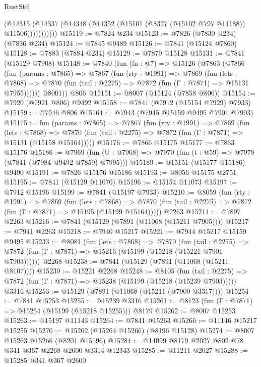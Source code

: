 \begin{lexlean}{RustStd}
\begin{coremodule}
                (@14315
                  (@14337 (@14348 (@14352 (@15101 (@8327 (@15102 @797 @11188)) @11506)))))))))))
@15119 := @7824 @234
@15123 := @7826 (@7830 @234) (@7836 @234)
@15124 := @7845 @9489
@15126 := @7841 (@15124 @7860)
@15128 := @7883 (@7884 @234)
@15129 := @7879 @15128
@15131 := @7841 (@15129 @7908)
@15148 := @7840
    (fun (fn : @7) =>
    @15126
      (@7863
        (@7866
          (fun (params : @7865) =>
          @7867
            (fun (rty : @1991) =>
            @7869
              (fun (lets : @7868) =>
              @7870 (fun (tail : @2275) => @7872 (fun (Γ : @7871) => @15131 @7955))))))
        @8001))
    @806
@15151 := @8007 (@15124 (@7858 @806))
@15154 := @7920 (@7921 @806) @9492
@15158 := @7841 (@7912 (@15154 @7929) @7933)
@15159 := @7946 @806
@15164 := @7943 (@7945 @15159 @9495 @7901 @7903)
@15175 := fun (params : @7865) =>
  @7867
    (fun (rty : @1991) =>
    @7869
      (fun (lets : @7868) =>
      @7870 (fun (tail : @2275) => @7872 (fun (Γ : @7871) => @15131 (@15158 @15164)))))
@15176 := @7866 @15175
@15177 := @7863 @15176
@15186 := @7969
    (fun (U : @7968) => @7970 (fun (t : @59) => @7978 (@7841 (@7984 @9492 @7859) @7995)))
@15189 := @15151 (@15177 @15186) @9490
@15191 := @7826 @15176 @15186
@15193 := @8056 @15175 @2751
@15195 := @7841 (@15129 @11070)
@15196 := @15154 @11073
@15197 := @7912 @15196
@15199 := @7841 (@15197 @7933)
@15210 := @8059
    (fun (rty : @1991) =>
    @7869
      (fun (lets : @7868) =>
      @7870 (fun (tail : @2275) => @7872 (fun (Γ : @7871) => @15195 (@15199 @15164)))))
    @2263
@15211 := @7897 @2263
@15216 := @7841 (@15129 (@7891 (@11068 (@15211 @7905))))
@15217 := @7941 @2263
@15218 := @7940 @15217
@15221 := @7944 @15217 @15159 @9495
@15233 := @8081
    (fun (lets : @7868) =>
    @7870
      (fun (tail : @2275) =>
      @7872 (fun (Γ : @7871) => @15216 (@15199 (@15218 (@15221 @7901 @7903))))))
    @2268
@15238 := @7841 (@15129 (@7891 (@11068 (@15211 @8107))))
@15239 := @15221 @2268
@15248 := @8105
    (fun (tail : @2275) => @7872 (fun (Γ : @7871) => @15238 (@15199 (@15218 (@15239 @7903)))))
    @3316
@15253 := @15129 (@7891 (@11068 (@15211 (@7900 @3317))))
@15254 := @7841 @15253
@15255 := @15239 @3316
@15261 := @8123 (fun (Γ : @7871) => @15254 (@15199 (@15218 @15255))) @8179
@15262 := @8007 @15253
@15263 := @15197 @11143
@15264 := @7841 @15263
@15266 := @11146 @15217 @15255
@15270 := @15262 (@15264 @15266) (@8196 @15128)
@15274 := @8007 @15263 @15266 (@8201 @15196)
@15284 := @14099 @8179 @2027 @802 @78 @341 @367 @2268 @2600 @3314 @12343
@15285 := @11211 @2027
@15288 := @15285 @341 @367 @2600

\end{coremodule}
\end{lexlean}
